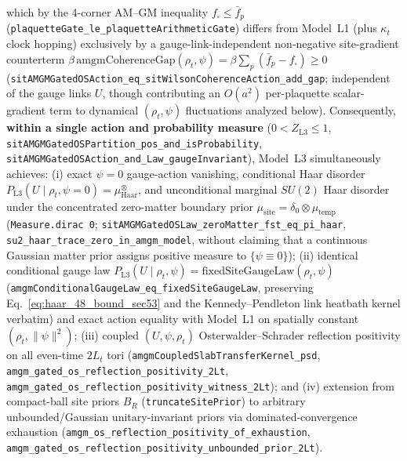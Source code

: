 \begin{enumerate}[leftmargin=2em]
  which by the 4-corner AM--GM inequality $f_\square \le \bar{f}_p$ (\texttt{plaquette\allowbreak{}Gate\_\allowbreak{}le\_\allowbreak{}plaquette\allowbreak{}Arithmetic\allowbreak{}Gate}) differs from Model~L1 (plus $\kappa_t$ clock hopping) exclusively by a gauge-link-independent non-negative site-gradient counterterm $\beta\,\mathrm{amgmCoherenceGap}(\rho_t,\psi) = \beta\sum_p(\bar{f}_p - f_\square) \ge 0$ (\texttt{sit\allowbreak{}AMGMGated\allowbreak{}OSAction\_\allowbreak{}eq\_\allowbreak{}sit\allowbreak{}Wilson\allowbreak{}Coherence\allowbreak{}Action\_\allowbreak{}add\_\allowbreak{}gap}; independent of the gauge links $U$, though contributing an $O(a^2)$ per-plaquette scalar-gradient term to dynamical $(\rho_t,\psi)$ fluctuations analyzed below). Consequently, \textbf{within a single action and probability measure} ($0 < Z_{\mathrm{L3}} \le 1$, \texttt{sit\allowbreak{}AMGMGated\allowbreak{}OSPartition\_\allowbreak{}pos\_\allowbreak{}and\_\allowbreak{}is\allowbreak{}Probability}, \texttt{sit\allowbreak{}AMGMGated\allowbreak{}OSAction\_\allowbreak{}and\_\allowbreak{}Law\_\allowbreak{}gauge\allowbreak{}Invariant}), Model~L3 simultaneously achieves: (i) exact $\psi = 0$ gauge-action vanishing, conditional Haar disorder $P_{\mathrm{L3}}(U\mid\rho_t,\psi=0) = \mu_{\mathrm{Haar}}^{\otimes}$, and unconditional marginal $SU(2)$ Haar disorder under the concentrated zero-matter boundary prior $\mu_{\mathrm{site}} = \delta_0 \otimes \mu_{\mathrm{temp}}$ (\texttt{Measure.dirac 0}; \texttt{sit\allowbreak{}AMGMGated\allowbreak{}OSLaw\_\allowbreak{}zero\allowbreak{}Matter\_\allowbreak{}fst\_\allowbreak{}eq\_\allowbreak{}pi\_\allowbreak{}haar}, \texttt{su2\_\allowbreak{}haar\_\allowbreak{}trace\_\allowbreak{}zero\_\allowbreak{}in\_\allowbreak{}amgm\_\allowbreak{}model}, without claiming that a continuous Gaussian matter prior assigns positive measure to $\{\psi \equiv 0\}$); (ii) identical conditional gauge law $P_{\mathrm{L3}}(U\mid\rho_t,\psi) = \mathrm{fixedSiteGaugeLaw}(\rho_t,\psi)$ (\texttt{amgm\allowbreak{}Conditional\allowbreak{}Gauge\allowbreak{}Law\_\allowbreak{}eq\_\allowbreak{}fixed\allowbreak{}Site\allowbreak{}Gauge\allowbreak{}Law}, preserving Eq.~\eqref{eq:haar_48_bound_sec53} and the Kennedy--Pendleton link heatbath kernel verbatim) and exact action equality with Model~L1 on spatially constant $(\rho_t,\|\psi\|^2)$; (iii) coupled $(U,\psi,\rho_t)$ Osterwalder--Schrader reflection positivity on all even-time $2L_t$ tori (\texttt{amgm\allowbreak{}Coupled\allowbreak{}Slab\allowbreak{}Transfer\allowbreak{}Kernel\_\allowbreak{}psd}, \texttt{amgm\_\allowbreak{}gated\_\allowbreak{}os\_\allowbreak{}reflection\_\allowbreak{}positivity\_\allowbreak{}2\allowbreak{}Lt}, \texttt{amgm\_\allowbreak{}gated\_\allowbreak{}os\_\allowbreak{}reflection\_\allowbreak{}positivity\_\allowbreak{}witness\_\allowbreak{}2\allowbreak{}Lt}); and (iv) extension from compact-ball site priors $B_R$ (\texttt{truncateSitePrior}) to arbitrary unbounded/Gaussian unitary-invariant priors via dominated-convergence exhaustion (\texttt{amgm\_\allowbreak{}os\_\allowbreak{}reflection\_\allowbreak{}positivity\_\allowbreak{}of\_\allowbreak{}exhaustion}, \texttt{amgm\_\allowbreak{}gated\_\allowbreak{}os\_\allowbreak{}reflection\_\allowbreak{}positivity\_\allowbreak{}unbounded\_\allowbreak{}prior\_\allowbreak{}2\allowbreak{}Lt}).

\end{enumerate}
